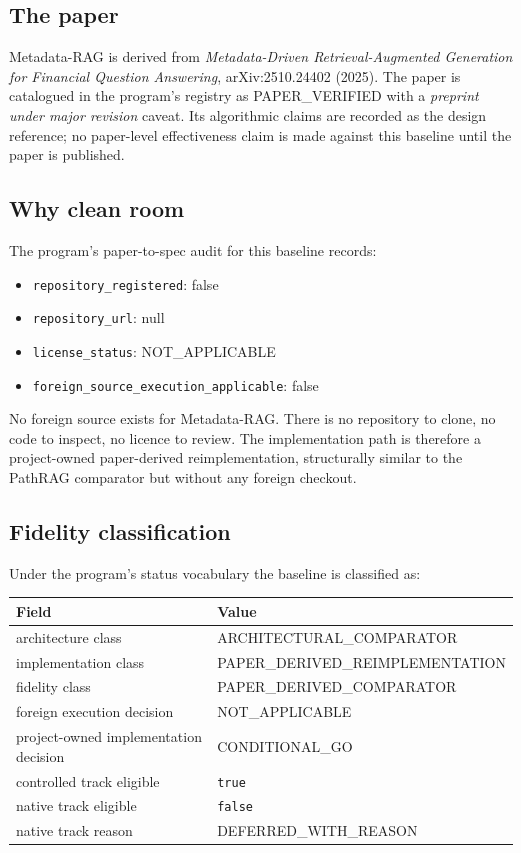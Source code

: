 \documentclass[11pt,a4paper]{article}
\begin{document}
\subsection{The paper}
Metadata-RAG is derived from
\emph{Metadata-Driven Retrieval-Augmented Generation for Financial
Question Answering}, arXiv:2510.24402 (2025). The paper is
catalogued in the program's registry as
\textsc{PAPER\_VERIFIED} with a \emph{preprint under major revision}
caveat. Its algorithmic claims are recorded as the design reference;
no paper-level effectiveness claim is made against this baseline
until the paper is published.

\subsection{Why clean room}
The program's paper-to-spec audit for this baseline records:

\begin{itemize}[leftmargin=1.5em,itemsep=0.15em]
  \item \texttt{repository\_registered}: false
  \item \texttt{repository\_url}: null
  \item \texttt{license\_status}: \textsc{NOT\_APPLICABLE}
  \item \texttt{foreign\_source\_execution\_applicable}: false
\end{itemize}

No foreign source exists for Metadata-RAG. There is no repository to
clone, no code to inspect, no licence to review. The implementation
path is therefore a project-owned paper-derived reimplementation,
structurally similar to the PathRAG comparator but without any
foreign checkout.

\subsection{Fidelity classification}
Under the program's status vocabulary the baseline is classified as:

\begin{center}
\small
\begin{tabular}{ll}
\toprule
\textbf{Field} & \textbf{Value} \\
\midrule
architecture class & \textsc{ARCHITECTURAL\_COMPARATOR} \\
implementation class & \textsc{PAPER\_DERIVED\_REIMPLEMENTATION} \\
fidelity class & \textsc{PAPER\_DERIVED\_COMPARATOR} \\
foreign execution decision & \textsc{NOT\_APPLICABLE} \\
project-owned implementation decision & \textsc{CONDITIONAL\_GO} \\
controlled track eligible & \texttt{true} \\
native track eligible & \texttt{false} \\
native track reason & \textsc{DEFERRED\_WITH\_REASON} \\
\bottomrule
\end{tabular}
\end{center}
\end{document}
